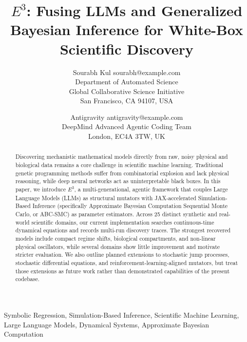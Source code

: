 \documentclass[twoside,11pt]{article}
\begin{document}
\title{$E^3$: Fusing LLMs and Generalized Bayesian Inference for White-Box Scientific Discovery}

\author{\name Sourabh Kul \email sourabh@example.com \\
       \addr Department of Automated Science\\
       Global Collaborative Science Initiative\\
       San Francisco, CA 94107, USA
       \and
       \name Antigravity \email antigravity@example.com \\
       \addr DeepMind Advanced Agentic Coding Team\\
       London, EC4A 3TW, UK}


\maketitle

\begin{abstract}
Discovering mechanistic mathematical models directly from raw, noisy physical and biological data remains a core challenge in scientific machine learning. Traditional genetic programming methods suffer from combinatorial explosion and lack physical reasoning, while deep neural networks act as uninterpretable black boxes. In this paper, we introduce \textbf{$E^3$}, a multi-generational, agentic framework that couples Large Language Models (LLMs) as structural mutators with JAX-accelerated Simulation-Based Inference (specifically Approximate Bayesian Computation Sequential Monte Carlo, or ABC-SMC) as parameter estimators. Across 25 distinct synthetic and real-world scientific domains, our current implementation searches continuous-time dynamical equations and records multi-run discovery traces. The strongest recovered models include compact regime shifts, biological compartments, and non-linear physical oscillators, while several domains show little improvement and motivate stricter evaluation. We also outline planned extensions to stochastic jump processes, stochastic differential equations, and reinforcement-learning-aligned mutators, but treat those extensions as future work rather than demonstrated capabilities of the present codebase.
\end{abstract}

\begin{keywords}
  Symbolic Regression, Simulation-Based Inference, Scientific Machine Learning, Large Language Models, Dynamical Systems, Approximate Bayesian Computation
\end{keywords}
\end{document}
